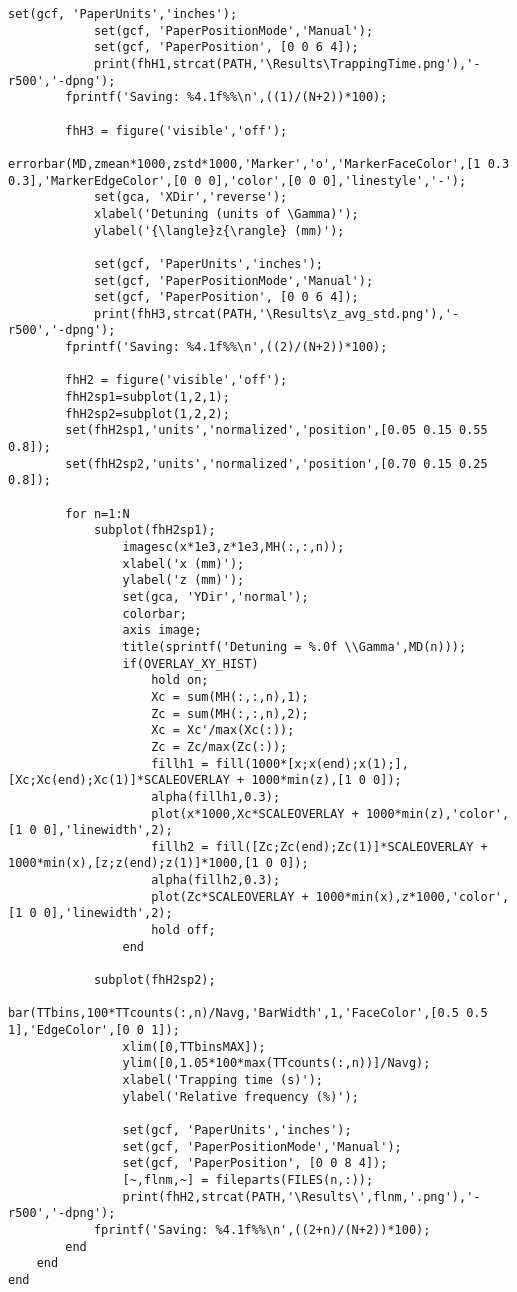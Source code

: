 \begin{lstlisting}[style=MatlabStyle]
            set(gcf, 'PaperUnits','inches');
            set(gcf, 'PaperPositionMode','Manual');
            set(gcf, 'PaperPosition', [0 0 6 4]);
            print(fhH1,strcat(PATH,'\Results\TrappingTime.png'),'-r500','-dpng');
        fprintf('Saving: %4.1f%%\n',((1)/(N+2))*100);
        
        fhH3 = figure('visible','off');
            errorbar(MD,zmean*1000,zstd*1000,'Marker','o','MarkerFaceColor',[1 0.3 0.3],'MarkerEdgeColor',[0 0 0],'color',[0 0 0],'linestyle','-');
            set(gca, 'XDir','reverse');
            xlabel('Detuning (units of \Gamma)');
            ylabel('{\langle}z{\rangle} (mm)');
        
            set(gcf, 'PaperUnits','inches');
            set(gcf, 'PaperPositionMode','Manual');
            set(gcf, 'PaperPosition', [0 0 6 4]);
            print(fhH3,strcat(PATH,'\Results\z_avg_std.png'),'-r500','-dpng');
        fprintf('Saving: %4.1f%%\n',((2)/(N+2))*100);
        
        fhH2 = figure('visible','off');
        fhH2sp1=subplot(1,2,1);
        fhH2sp2=subplot(1,2,2);
        set(fhH2sp1,'units','normalized','position',[0.05 0.15 0.55 0.8]);
        set(fhH2sp2,'units','normalized','position',[0.70 0.15 0.25 0.8]);
        
        for n=1:N
            subplot(fhH2sp1);
                imagesc(x*1e3,z*1e3,MH(:,:,n));
                xlabel('x (mm)');
                ylabel('z (mm)');
                set(gca, 'YDir','normal');
                colorbar;
                axis image;
                title(sprintf('Detuning = %.0f \\Gamma',MD(n)));
                if(OVERLAY_XY_HIST)
                    hold on;
                    Xc = sum(MH(:,:,n),1);
                    Zc = sum(MH(:,:,n),2);
                    Xc = Xc'/max(Xc(:));
                    Zc = Zc/max(Zc(:));
                    fillh1 = fill(1000*[x;x(end);x(1);],[Xc;Xc(end);Xc(1)]*SCALEOVERLAY + 1000*min(z),[1 0 0]);
                    alpha(fillh1,0.3);
                    plot(x*1000,Xc*SCALEOVERLAY + 1000*min(z),'color',[1 0 0],'linewidth',2);
                    fillh2 = fill([Zc;Zc(end);Zc(1)]*SCALEOVERLAY + 1000*min(x),[z;z(end);z(1)]*1000,[1 0 0]);
                    alpha(fillh2,0.3);
                    plot(Zc*SCALEOVERLAY + 1000*min(x),z*1000,'color',[1 0 0],'linewidth',2);
                    hold off;
                end

            subplot(fhH2sp2);
                bar(TTbins,100*TTcounts(:,n)/Navg,'BarWidth',1,'FaceColor',[0.5 0.5 1],'EdgeColor',[0 0 1]);
                xlim([0,TTbinsMAX]);
                ylim([0,1.05*100*max(TTcounts(:,n))]/Navg);
                xlabel('Trapping time (s)');
                ylabel('Relative frequency (%)');

                set(gcf, 'PaperUnits','inches');
                set(gcf, 'PaperPositionMode','Manual');
                set(gcf, 'PaperPosition', [0 0 8 4]);
                [~,flnm,~] = fileparts(FILES(n,:));
                print(fhH2,strcat(PATH,'\Results\',flnm,'.png'),'-r500','-dpng');
            fprintf('Saving: %4.1f%%\n',((2+n)/(N+2))*100);
        end
    end
end
\end{lstlisting}